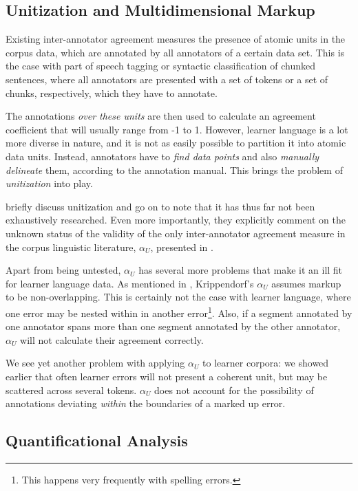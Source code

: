 \documentclass{scrartcl}
\begin{document}
\subsection{Unitization and Multidimensional Markup}

Existing inter-annotator agreement measures %
the presence of atomic units in the corpus data, which are annotated by all
annotators of a certain data set. This is the case with part of speech tagging
or syntactic classification of chunked sentences, where all annotators are
presented with a set of tokens or a set of chunks, respectively, which they have
to annotate.

The annotations \textit{over these units} are then used to calculate an
agreement coefficient that will usually range from -1 to 1. However, learner
language is a lot more diverse in nature, and it is not as easily possible to
partition it into atomic data units. Instead, annotators have to \textit{find
data points} and also \textit{manually delineate} them, according to the
annotation manual. This brings the problem of \textit{unitization} into play.

\cite{ap2008} briefly discuss unitization and go on to note that it has thus far
not been exhaustively researched. Even more importantly, they explicitly comment
on the unknown status of the validity of the only inter-annotator agreement
measure in the corpus linguistic literature, $\alpha_U$, presented in
\cite{krip1995}.

Apart from being untested, $\alpha_U$ has several more problems that make it an
ill fit for learner language data. As mentioned in \cite{ap2008}, Krippendorf's
$\alpha_U$ assumes markup to be non-overlapping. This is certainly not the case
with learner language, where one error may be nested within in another
error\footnote{This happens very frequently with spelling errors.}. Also, if a
segment annotated by one annotator spans more than one segment annotated by the
other annotator, $\alpha_U$ will not calculate their agreement correctly.

We see yet another problem with applying $\alpha_U$ to learner corpora: we
showed earlier %
that often learner errors will not present a coherent unit, but may be scattered
across several tokens. $\alpha_U$ does not account for the possibility of
annotations deviating \textit{within} the boundaries of a marked up error.

\subsection{Quantificational Analysis}
\end{document}
